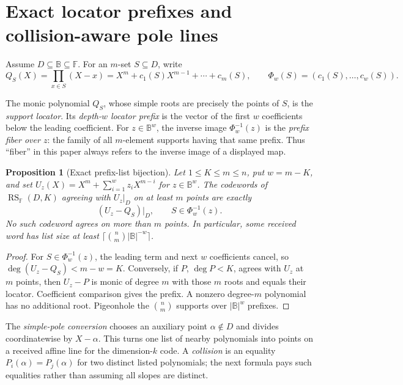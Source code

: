 \documentclass[12pt,a4paper]{amsart}
\numberwithin{equation}{section}
\newtheorem{proposition}[proposition]{Proposition}
\theoremstyle{remark}
\DeclareMathOperator{\RS}{RS}
\newcommand{\F}{\mathbb F}
\newcommand{\B}{\mathbb B}
\newcommand{\abs}[1]{\lvert #1\rvert}
\begin{document}
\section{Exact locator prefixes and collision-aware pole lines}
\label{sec:exact-prefix-pole}

Assume \(D\subseteq\B\subseteq\F\).  For an \(m\)-set \(S\subseteq D\),
write
\[
 Q_S(X)=\prod_{x\in S}(X-x)
       =X^m+c_1(S)X^{m-1}+\cdots+c_m(S),
 \qquad
 \Phi_w(S)=(c_1(S),\ldots,c_w(S)).
\]

The monic polynomial \(Q_S\), whose simple roots are precisely the points
of \(S\), is the \emph{support locator}.  Its \emph{depth-\(w\) locator
prefix} is the vector of the first \(w\) coefficients below the leading
coefficient.  For \(z\in\B^w\), the inverse image
\(\Phi_w^{-1}(z)\) is the \emph{prefix fiber over \(z\)}: the family of
all \(m\)-element supports having that same prefix.  Thus ``fiber'' in this
paper always refers to the inverse image of a displayed map.

\begin{proposition}[Exact prefix-list bijection]\label{prop:exact-prefix-list}
Let \(1\le K\le m\le n\), put \(w=m-K\), and set
\(U_z(X)=X^m+\sum_{i=1}^wz_iX^{m-i}\) for \(z\in\B^w\).  The codewords of
\(\RS_\F(D,K)\) agreeing with \(U_z|_D\) on at least \(m\) points are
exactly
\[
        (U_z-Q_S)|_D,\qquad S\in\Phi_w^{-1}(z).
 \tag{4.1}\label{eq:prefix-bijection}
\]
No such codeword agrees on more than \(m\) points.  In particular, some
received word has list size at least
\(\lceil\binom nm\abs\B^{-w}\rceil\).
\end{proposition}

\begin{proof}
For \(S\in\Phi_w^{-1}(z)\), the leading term and next \(w\) coefficients
cancel, so \(\deg(U_z-Q_S)<m-w=K\).  Conversely, if \(P\), \(\deg P<K\),
agrees with \(U_z\) at \(m\) points, then \(U_z-P\) is monic of degree
\(m\) with those \(m\) roots and equals their locator.  Coefficient
comparison gives the prefix.  A nonzero degree-\(m\) polynomial has no
additional root.  Pigeonhole the \(\binom nm\) supports over
\(\abs\B^w\) prefixes.
\end{proof}

The \emph{simple-pole conversion} chooses an auxiliary point
\(\alpha\notin D\) and divides coordinatewise by \(X-\alpha\).  This
turns one list of nearby polynomials into points on a received affine line
for the dimension-\(k\) code.  A \emph{collision} is an equality
\(P_i(\alpha)=P_j(\alpha)\) for two distinct listed polynomials; the next
formula pays such equalities rather than assuming all slopes are distinct.
\end{document}
